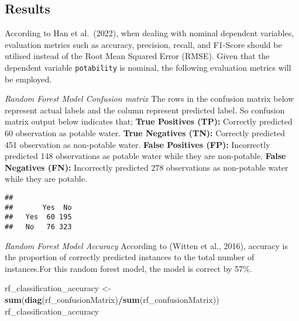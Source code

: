 \documentclass[
]{article}
\newenvironment{Shaded}{\begin{snugshade}}{\end{snugshade}}
\newcommand{\FunctionTok}[1]{\textcolor[rgb]{0.13,0.29,0.53}{\textbf{#1}}}
\newcommand{\NormalTok}[1]{#1}
\newcommand{\OtherTok}[1]{\textcolor[rgb]{0.56,0.35,0.01}{#1}}
\newcommand{\SpecialCharTok}[1]{\textcolor[rgb]{0.81,0.36,0.00}{\textbf{#1}}}
\begin{document}
\subsection{Results}\label{results}

According to Han et al.~(2022), when dealing with nominal dependent
variables, evaluation metrics such as accuracy, precision, recall, and
F1-Score should be utilised instead of the Root Mean Squared Error
(RMSE). Given that the dependent variable \texttt{potability} is
nominal, the following evaluation metrics will be employed.

\emph{Random Forest Model Confusion matrix} The rows in the confusion
matrix below represent actual labels and the column represent predicted
label. So confusion matrix output below indicates that; \textbf{True
Positives (TP):} Correctly predicted 60 observation as potable water.
\textbf{True Negatives (TN):} Correctly predicted 451 observation as
non-potable water. \textbf{False Positives (FP):} Incorrectly predicted
148 observations as potable water while they are non-potable.
\textbf{False Negatives (FN):} Incorrectly predicted 278 observations as
non-potable water while they are potable.

\begin{Shaded}
\end{Shaded}

\begin{verbatim}
##      
##       Yes  No
##   Yes  60 195
##   No   76 323
\end{verbatim}

\emph{Random Forest Model Accuracy} According to (Witten et al., 2016),
accuracy is the proportion of correctly predicted instances to the total
number of instances.For this random forest model, the model is correct
by 57\%.

\begin{Shaded}
\begin{Highlighting}[]
\NormalTok{rf\_classification\_accuracy }\OtherTok{\textless{}{-}} \FunctionTok{sum}\NormalTok{(}\FunctionTok{diag}\NormalTok{(rf\_confusionMatrix)}\SpecialCharTok{/}\FunctionTok{sum}\NormalTok{(rf\_confusionMatrix))}
\NormalTok{rf\_classification\_accuracy}
\end{Highlighting}
\end{Shaded}
\end{document}
